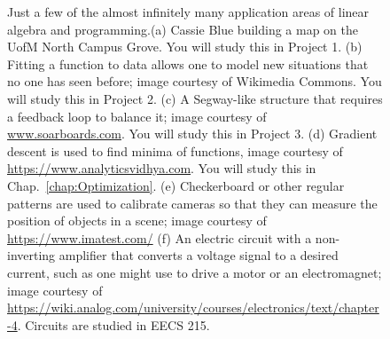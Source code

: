 \begin{figure}[b!]%
\centering
{}%
\hspace{5pt}%
%
\hspace{5pt}%
%
\hspace{5pt}%
\hspace{5pt}%
%
\hspace{5pt}%
%
    \caption[]{Just a few of the almost infinitely many application areas  of linear algebra and programming.(a) Cassie Blue building a map on the UofM North Campus Grove. You will study this in Project 1. (b) Fitting a function to data allows one to model new situations that no one has seen before; image courtesy of Wikimedia Commons. You will study this in Project 2. (c) A Segway-like structure that requires a feedback loop to balance it;  image courtesy of \url{www.soarboards.com}. You will study this in Project 3. (d) Gradient descent is used to find minima of functions, image courtesy of \url{https://www.analyticsvidhya.com}. You will study this in Chap.~\ref{chap:Optimization}. (e) Checkerboard or other regular patterns are used to calibrate cameras so that they can measure the position of objects in a scene; image courtesy of \url{https://www.imatest.com/} (f) An electric circuit with a non-inverting amplifier that converts a voltage signal to a desired current, such as one might use to drive a motor or an electromagnet; image courtesy of \url{https://wiki.analog.com/university/courses/electronics/text/chapter-4}. Circuits are studied in EECS 215. }
    \label{fig:ApplicationsLinearAlgebra}
\end{figure}
